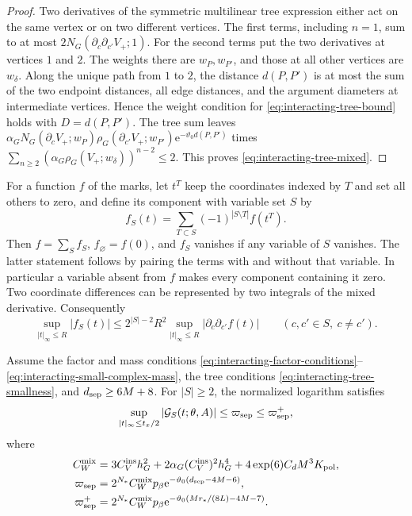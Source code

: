 \begin{proof}
Two derivatives of the symmetric multilinear
tree expression either act on the same vertex
or on two different vertices. The first
terms, including $n=1$, sum to at most
$2N_G(\partial_c\partial_{c'}V_+;1)$.
For the second terms put the two derivatives
at vertices $1$ and $2$. The weights there
are $w_P,w_{P'}$, and those at all other
vertices are $w_\delta$.
Along the unique path from $1$ to $2$,
the distance $d(P,P')$ is at most the
sum of the two endpoint distances, all
edge distances, and the argument diameters
at intermediate vertices. Hence the weight
condition for \eqref{eq:interacting-tree-bound}
holds with $D=d(P,P')$. The tree sum leaves
$\alpha_GN_G(\partial_cV_+;w_P)
\rho_G(\partial_{c'}V_+;w_{P'})
\mathrm e^{-\vartheta_0d(P,P')}$ times
$\sum_{n\ge2}(\alpha_G\rho_G(V_+;w_\delta))^{n-2}\le2$.
This proves \eqref{eq:interacting-tree-mixed}.
\end{proof}

For a function $f$ of the marks, let
$t^T$ keep the coordinates indexed by $T$
and set all others to zero, and define
its component with variable set $S$ by
\[
 f_S(t)=\sum_{T\subset S}(-1)^{|S\setminus T|}f(t^T).
\]
Then $f=\sum_Sf_S$, $f_\varnothing=f(0)$,
and $f_S$ vanishes if any variable of $S$
vanishes. The latter statement follows by
pairing the terms with and without that
variable. In particular a variable absent
from $f$ makes every component containing
it zero. Two coordinate differences can
be represented by two integrals of the
mixed derivative. Consequently
\begin{equation}\label{eq:interacting-Mobius-bound}
 \sup_{|t|_\infty\le R}|f_S(t)|
 \le2^{|S|-2}R^2
          \sup_{|t|_\infty\le R}|\partial_c\partial_{c'}f(t)|
 \qquad(c,c'\in S,\ c\ne c').
\end{equation}

\begin{proposition}\label{prop:interacting-mixed-logarithm}
Assume the factor and mass conditions
\eqref{eq:interacting-factor-conditions}--\eqref{eq:interacting-small-complex-mass},
the tree conditions \eqref{eq:interacting-tree-smallness}, and
$d_{\rm sep}\ge6M+8$. For $|S|\ge2$, the normalized logarithm satisfies
\begin{equation}\label{eq:interacting-mixed-logarithm}
 \sup_{|t|_\infty\le t_x/2}|\mathcal G_S(t;\theta,A)|
                     \le\varpi_{\rm sep}\le\varpi_{\rm sep}^+,
\end{equation}
where
\begin{align}
 C_W^{\mathrm{mix}}&=3C_V^{\mathrm{ins}}h_G^2+2\alpha_G(C_V^{\mathrm{ins}})^2h_G^4
                             +4\exp(6)C_dM^3K_{\mathrm{pol}},\notag\\
 \varpi_{\rm sep}&=2^{N_*}C_W^{\mathrm{mix}}p_\beta
                    \mathrm e^{-\vartheta_0(d_{\rm sep}-4M-6)},\notag\\
 \varpi_{\rm sep}^+&=2^{N_*}C_W^{\mathrm{mix}}p_\beta
                    \mathrm e^{-\vartheta_0(Mr_*/(8L)-4M-7)} .
                                  \label{eq:interacting-separation-errors}
\end{align}
\end{proposition}

